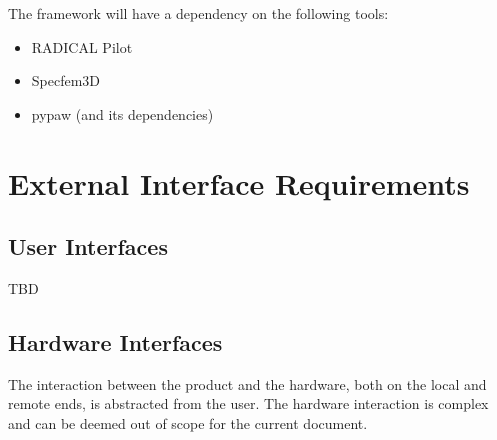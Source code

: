 \documentclass{scrreprt}
\begin{document}
The framework will have a dependency on the following tools:

\begin{itemize}[noitemsep]
\item RADICAL Pilot
\item Specfem3D
\item pypaw (and its dependencies)
\end{itemize}
\chapter{External Interface Requirements}

\section{User Interfaces}

TBD

\section{Hardware Interfaces}

The interaction between the product and the hardware, both on the local and remote ends, is abstracted from the user. The hardware interaction is complex and can be deemed out of scope for the current document.
\end{document}
